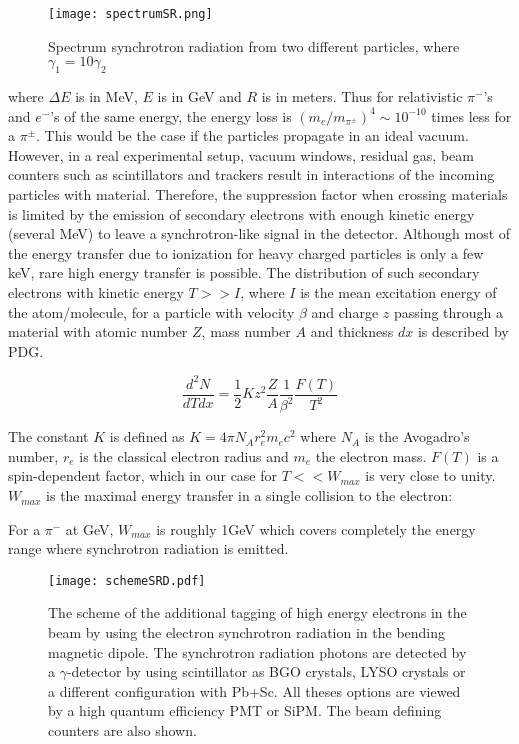 \begin{figure}[htbp]
\begin{center}
\texttt{[image: spectrumSR.png]}
\caption{Spectrum synchrotron radiation from two different particles, where $\gamma_{1}=10\gamma_{2}$}
\label{default}
\end{center}
\end{figure}

where $\Delta E$ is in \unit{MeV}, $E$ is in \unit{GeV} and $R$ is in meters. Thus for relativistic $\pi^-$'s and
$e^-$'s of the same energy, the energy loss is $(m_e/m_{\pi^{\pm}})^4\sim 10^{-10}$ times less for a $\pi^{\pm}$. This
would be the case if the particles propagate in an ideal vacuum. However, in a real experimental setup, vacuum windows,
residual gas, beam counters such as scintillators and trackers result in interactions of the incoming particles with
material. Therefore, the suppression factor when crossing materials is limited by the emission of secondary electrons
with enough kinetic energy (several MeV) to leave a synchrotron-like signal in the detector. Although most of the energy
transfer due to ionization for heavy charged particles is only a few keV, rare high energy transfer is possible. The
distribution of such secondary electrons with kinetic energy $T>>I$, where $I$ is the mean excitation energy of the
atom/molecule, for a particle with velocity $\beta$ and charge $z$ passing through a material with atomic number $Z$,
mass number $A$ and thickness $dx$ is described by PDG.

\begin{equation}
\frac{d^2N}{dTdx}=\frac{1}{2}Kz^2\frac{Z}{A}\frac{1}{\beta^2}\frac{F(T)}{T^2}
\end{equation}

The constant $K$ is defined as $K=4\pi N_A r^2_em_ec^2$ where $N_A$ is the Avogadro's number, $r_e$ is the classical
electron radius and $m_e$ the electron mass. $F(T)$ is a spin-dependent factor, which in our case for $T<<W_{max}$ is
very close to unity. $W_{max}$ is the maximal energy transfer in a single collision to the electron:

For a $\pi^-$ at \si{\giga\electronvolt}, $W_{max}$ is roughly 1\si{\giga\electronvolt} which covers completely the
energy range where synchrotron radiation is emitted. 


\begin{figure}[ht]
	\hspace*{\fill}
	\centering
	\texttt{[image: schemeSRD.pdf]}
	\hspace*{\fill}
	\captionsetup{margin=1cm}
	\caption{The scheme of the additional tagging of high energy electrons in the beam by using the electron synchrotron
	radiation in the bending magnetic dipole. The synchrotron radiation photons are detected by a $\gamma$-detector by
	using scintillator as BGO crystals, LYSO crystals or a different configuration with Pb+Sc. All theses options are viewed
	by a high quantum efficiency PMT or SiPM. The beam defining counters are also shown.}
	\label{}
\end{figure}



